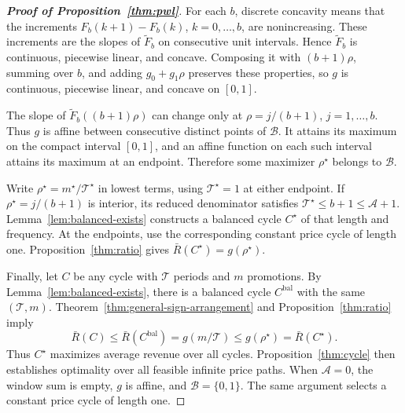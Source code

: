 \begin{proof}[\normalfont\bfseries Proof of Proposition~\ref{thm:pwl}]
For each \(b\), discrete concavity means that the increments \(F_b(k+1)-F_b(k)\), \(k=0,\ldots,b\), are nonincreasing. These increments are the slopes of \(\widetilde F_b\) on consecutive unit intervals. Hence \(\widetilde F_b\) is continuous, piecewise linear, and concave. Composing it with \((b+1)\rho\), summing over \(b\), and adding \(g_0+g_1\rho\) preserves these properties, so \(g\) is continuous, piecewise linear, and concave on \([0,1]\).

The slope of \(\widetilde F_b((b+1)\rho)\) can change only at \(\rho=j/(b+1)\), \(j=1,\ldots,b\). Thus \(g\) is affine between consecutive distinct points of \(\mathcal B\). It attains its maximum on the compact interval \([0,1]\), and an affine function on each such interval attains its maximum at an endpoint. Therefore some maximizer \(\rho^\star\) belongs to \(\mathcal B\).

Write \(\rho^\star=m^\star/\mathcal T^\star\) in lowest terms, using \(\mathcal T^\star=1\) at either endpoint. If \(\rho^\star=j/(b+1)\) is interior, its reduced denominator satisfies \(\mathcal T^\star\le b+1\le\mathcal A+1\). Lemma~\ref{lem:balanced-exists} constructs a balanced cycle \(C^\star\) of that length and frequency. At the endpoints, use the corresponding constant price cycle of length one. Proposition~\ref{thm:ratio} gives \(\bar R(C^\star)=g(\rho^\star)\).

Finally, let \(C\) be any cycle with \(\mathcal T\) periods and \(m\) promotions. By Lemma~\ref{lem:balanced-exists}, there is a balanced cycle \(C^{\mathrm{bal}}\) with the same \((\mathcal T,m)\). Theorem~\ref{thm:general-sign-arrangement} and Proposition~\ref{thm:ratio} imply
\[
 \bar R(C)\le\bar R(C^{\mathrm{bal}})
 =g(m/\mathcal T)
 \le g(\rho^\star)
 =\bar R(C^\star).
\]
Thus \(C^\star\) maximizes average revenue over all cycles. Proposition~\ref{thm:cycle} then establishes optimality over all feasible infinite price paths. When \(\mathcal A=0\), the window sum is empty, \(g\) is affine, and \(\mathcal B=\{0,1\}\). The same argument selects a constant price cycle of length one.
\end{proof}



